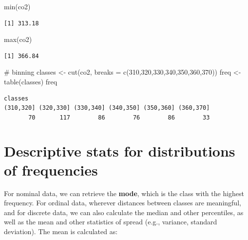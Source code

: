 \documentclass[
  letterpaper,
  DIV=11,
  numbers=noendperiod]{scrreprt}
\newenvironment{Shaded}{\begin{snugshade}}{\end{snugshade}}
\newcommand{\AttributeTok}[1]{\textcolor[rgb]{0.40,0.45,0.13}{#1}}
\newcommand{\CommentTok}[1]{\textcolor[rgb]{0.37,0.37,0.37}{#1}}
\newcommand{\DecValTok}[1]{\textcolor[rgb]{0.68,0.00,0.00}{#1}}
\newcommand{\FunctionTok}[1]{\textcolor[rgb]{0.28,0.35,0.67}{#1}}
\newcommand{\NormalTok}[1]{\textcolor[rgb]{0.00,0.23,0.31}{#1}}
\newcommand{\OtherTok}[1]{\textcolor[rgb]{0.00,0.23,0.31}{#1}}
\begin{document}
\begin{Shaded}
\begin{Highlighting}[]
\FunctionTok{min}\NormalTok{(co2)}
\end{Highlighting}
\end{Shaded}

\begin{verbatim}
[1] 313.18
\end{verbatim}

\begin{Shaded}
\begin{Highlighting}[]
\FunctionTok{max}\NormalTok{(co2)}
\end{Highlighting}
\end{Shaded}

\begin{verbatim}
[1] 366.84
\end{verbatim}

\begin{Shaded}
\begin{Highlighting}[]
\CommentTok{\# binning}
\NormalTok{classes }\OtherTok{\textless{}{-}} \FunctionTok{cut}\NormalTok{(co2, }\AttributeTok{breaks =} \FunctionTok{c}\NormalTok{(}\DecValTok{310}\NormalTok{,}\DecValTok{320}\NormalTok{,}\DecValTok{330}\NormalTok{,}\DecValTok{340}\NormalTok{,}\DecValTok{350}\NormalTok{,}\DecValTok{360}\NormalTok{,}\DecValTok{370}\NormalTok{))}
\NormalTok{freq }\OtherTok{\textless{}{-}} \FunctionTok{table}\NormalTok{(classes)}
\NormalTok{freq}
\end{Highlighting}
\end{Shaded}

\begin{verbatim}
classes
(310,320] (320,330] (330,340] (340,350] (350,360] (360,370] 
       70       117        86        76        86        33 
\end{verbatim}

\section{Descriptive stats for distributions of
frequencies}\label{descriptive-stats-for-distributions-of-frequencies}

For nominal data, we can retrieve the \textbf{mode}, which is the class
with the highest frequency. For ordinal data, wherever distances between
classes are meaningful, and for discrete data, we can also calculate the
median and other percentiles, as well as the mean and other statistics
of spread (e.g., variance, standard deviation). The mean is calculated
as:
\end{document}
